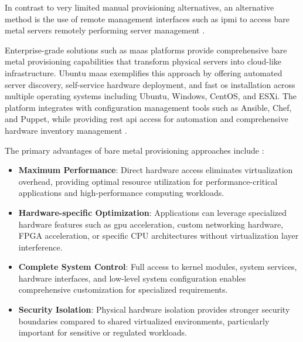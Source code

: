 In contrast to very limited manual provisioning alternatives, an alternative method is the use of remote management interfaces such as \ac{ipmi} to access bare metal servers remotely performing server management \citep{intelIntelligentPlatformManagement2015}.

Enterprise-grade solutions such as \ac{maas} platforms provide comprehensive bare metal provisioning capabilities that transform physical servers into cloud-like infrastructure.
Ubuntu \ac{maas} exemplifies this approach by offering automated server discovery, self-service hardware deployment, and fast \ac{os} installation across multiple operating systems including Ubuntu, Windows, CentOS, and ESXi.
The platform integrates with configuration management tools such as Ansible, Chef, and Puppet, while providing \ac{rest} \ac{api} access for automation and comprehensive hardware inventory management \citep{canonicalUbuntuMAASMetal2025}.

The primary advantages of bare metal provisioning approaches include \citep{felterUpdatedPerformanceComparison2015,nemethUNIXLinuxSystem2017}:
\begin{itemize}
    \item \textbf{Maximum Performance}: Direct hardware access eliminates virtualization overhead, providing optimal resource utilization for performance-critical applications and high-performance computing workloads.
    \item \textbf{Hardware-specific Optimization}: Applications can leverage specialized hardware features such as \ac{gpu} acceleration, custom networking hardware, FPGA acceleration, or specific CPU architectures without virtualization layer interference.
    \item \textbf{Complete System Control}: Full access to kernel modules, system services, hardware interfaces, and low-level system configuration enables comprehensive customization for specialized requirements.
    \item \textbf{Security Isolation}: Physical hardware isolation provides stronger security boundaries compared to shared virtualized environments, particularly important for sensitive or regulated workloads.
\end{itemize}

